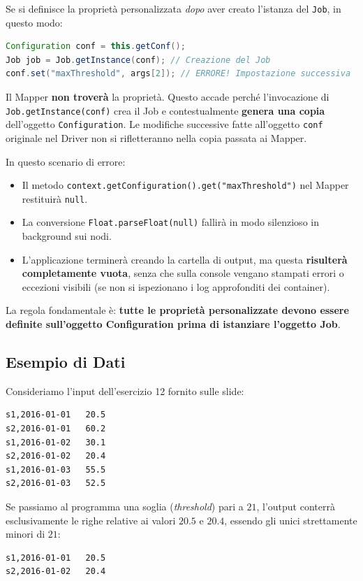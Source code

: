 Se si definisce la proprietà personalizzata \textit{dopo} aver creato l'istanza del \texttt{Job}, in questo modo:
\begin{lstlisting}[language=Java]
Configuration conf = this.getConf();
Job job = Job.getInstance(conf); // Creazione del Job
conf.set("maxThreshold", args[2]); // ERRORE! Impostazione successiva
\end{lstlisting}

Il Mapper \textbf{non troverà} la proprietà. Questo accade perché l'invocazione di \texttt{Job.getInstance(conf)} crea il Job e contestualmente \textbf{genera una copia} dell'oggetto \texttt{Configuration}. Le modifiche successive fatte all'oggetto \texttt{conf} originale nel Driver non si rifletteranno nella copia passata ai Mapper.

In questo scenario di errore:
\begin{itemize}
    \item Il metodo \texttt{context.getConfiguration().get("maxThreshold")} nel Mapper restituirà \texttt{null}.
    \item La conversione \texttt{Float.parseFloat(null)} fallirà in modo silenzioso in background sui nodi.
    \item L'applicazione terminerà creando la cartella di output, ma questa \textbf{risulterà completamente vuota}, senza che sulla console vengano stampati errori o eccezioni visibili (se non si ispezionano i log approfonditi dei container).
\end{itemize}

La regola fondamentale è: \textbf{tutte le proprietà personalizzate devono essere definite sull'oggetto Configuration prima di istanziare l'oggetto Job}.

\subsection{Esempio di Dati}
Consideriamo l'input dell'esercizio 12 fornito sulle slide:
\begin{verbatim}
s1,2016-01-01   20.5
s2,2016-01-01   60.2
s1,2016-01-02   30.1
s2,2016-01-02   20.4
s1,2016-01-03   55.5
s2,2016-01-03   52.5
\end{verbatim}
Se passiamo al programma una soglia (\textit{threshold}) pari a $21$, l'output conterrà esclusivamente le righe relative ai valori $20.5$ e $20.4$, essendo gli unici strettamente minori di $21$:
\begin{verbatim}
s1,2016-01-01   20.5
s2,2016-01-02   20.4
\end{verbatim}

